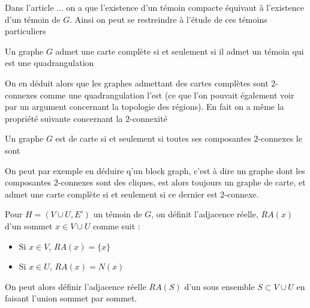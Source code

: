 \documentclass{scrartcl}
\begin{document}
\begin{flushleft}
Dans l'article ... on a que l'existence d'un témoin compacte équivaut à l'existence d'un témoin de $G$. Ainsi on peut se restreindre
à l'étude de ces témoins particuliers

\begin{theorem}\label{complQuadr}
    Un graphe $G$ admet une carte complète si et seulement si il admet un témoin qui est une quadrangulation
\end{theorem}

On en déduit alors que les graphes admettant des cartes complètes sont $2$-connexes comme une quadrangulation l'est (ce que l'on pouvait
également voir par un argument concernant la topologie des régions). En fait on a même la propriété suivante concernant la
$2$-connexité

\begin{prop}
    Un graphe $G$ est de carte si et seulement si toutes ses composantes $2$-connexes le sont
\end{prop}

On peut par exemple en déduire q'un block graph, c'est à dire un graphe dont les composantes $2$-connexes sont des cliques,
est alors toujours un graphe de carte, et admet une carte complète si et seulement si ce dernier est $2$-connexe.

\begin{def*}
    Pour $H = (V \cup U, E')$ un témoin de $G$, on définit l'adjacence réelle, $RA(x)$ d'un sommet $x \in V \cup U$ comme suit :
    \begin{itemize}
        \item Si $x \in V$, $RA(x) = \{x\}$
        \item Si $x \in U$, $RA(x) = N(x)$
    \end{itemize}
    On peut alors définir l'adjacence réelle $RA(S)$ d'un sous ensemble $S \subset V \cup U$ en faisant l'union sommet par sommet.
\end{def*}

\begin{comment}

\subsection{Contractibilité des arrêtes}

On aimerait donner une condition nécessaire et suffisante permettant de contracter les arrêtes d'un graphe de carte.
Certaines arrêtes sont clairement contractibles, comme celles représentées par $2$ régions partageant une courbe, d'autres ne le sont
pas, comme l'arrête $xy$ du graphe $G_{pch}$ \ref{Gpch}, qui est un graphe de carte.
On dénotera par $\mathcal{G}_{pch}$ l'ensemble des graphes obtenu depuis $G_{pch}$,
en ajoutant des arrêtes entre les sommets distincts de $a, b, c$


\end{comment}
\end{flushleft}
\end{document}
